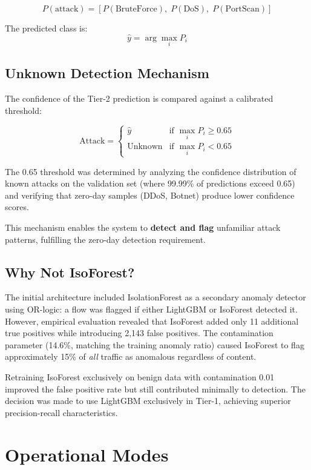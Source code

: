 \documentclass[12pt,a4paper,twoside]{report}
\begin{document}
\[
P(\text{attack}) = [P(\text{BruteForce}),\; P(\text{DoS}),\; P(\text{PortScan})]
\]

The predicted class is:
\[
\hat{y} = \arg\max_i P_i
\]

\subsection{Unknown Detection Mechanism}

The confidence of the Tier-2 prediction is compared against a calibrated threshold:

\[
\text{Attack} = \begin{cases}
\hat{y} & \text{if } \max_i P_i \geq 0.65 \\
\text{Unknown} & \text{if } \max_i P_i < 0.65
\end{cases}
\]

The 0.65 threshold was determined by analyzing the confidence distribution of known attacks on the validation set (where 99.99\% of predictions exceed 0.65) and verifying that zero-day samples (DDoS, Botnet) produce lower confidence scores.

This mechanism enables the system to \textbf{detect and flag} unfamiliar attack patterns, fulfilling the zero-day detection requirement.

\subsection{Why Not IsoForest?}

The initial architecture included IsolationForest as a secondary anomaly detector using OR-logic: a flow was flagged if either LightGBM or IsoForest detected it. However, empirical evaluation revealed that IsoForest added only 11 additional true positives while introducing 2,143 false positives. The contamination parameter (14.6\%, matching the training anomaly ratio) caused IsoForest to flag approximately 15\% of \textit{all} traffic as anomalous regardless of content.

Retraining IsoForest exclusively on benign data with contamination 0.01 improved the false positive rate but still contributed minimally to detection. The decision was made to use LightGBM exclusively in Tier-1, achieving superior precision-recall characteristics.

\section{Operational Modes}
\end{document}
